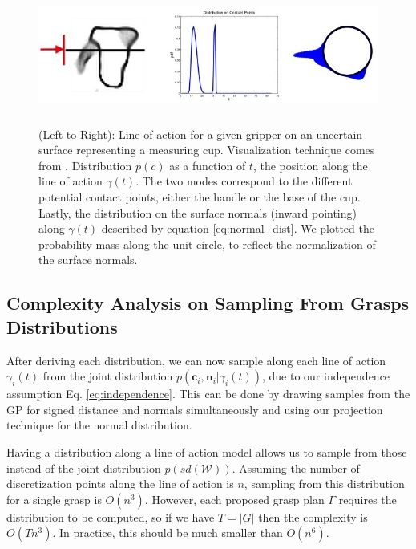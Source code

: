 \documentclass[letterpaper, 10 pt, conference]{ieeeconf}  %
\begin{document}
\begin{figure}[ht!]
\centering
\includegraphics[width = 17cm, height = 4.5cm]{figures/Slide04.jpg}
\caption{ \footnotesize (Left to Right): Line of action for a given gripper on an uncertain surface representing a measuring cup. Visualization technique comes from \cite{mahler2015opt}. Distribution $p(c)$ as a function of $t$, the position along the line of action $\gamma(t)$. The two modes correspond to the different potential contact points, either the handle or the base of the cup. Lastly, the distribution on the surface normals (inward pointing) along $\gamma(t)$ described by equation \ref{eq:normal_dist}. We plotted the probability mass along the unit circle, to reflect the normalization of the surface normals. }
\vspace*{-10pt}
\label{fig:GraspDist}
\end{figure}


\subsection{Complexity Analysis on Sampling From Grasps Distributions}

After deriving each distribution,  we can now sample along each line of action $\gamma_i(t)$ from the joint distribution $p(\textbf{c}_i,\textbf{n}_i | \gamma_i(t))$, due to our independence assumption Eq. \ref{eq:independence}. This can be done by drawing samples from the GP for signed distance and normals simultaneously and using our projection technique for the normal distribution. 

Having a distribution along a line of action model allows us to sample from those instead of the joint distribution $p(sd(\mathcal{W}))$. Assuming the number of discretization points along the line of action is $n$, sampling from this distribution for a single grasp is $O(n^3)$. However, each proposed grasp plan $\Gamma$ requires the distribution to be computed, so if we have $T=|G|$ then the complexity is $O(Tn^3)$. In practice, this should be much smaller than $O(n^6)$. 
\end{document}
